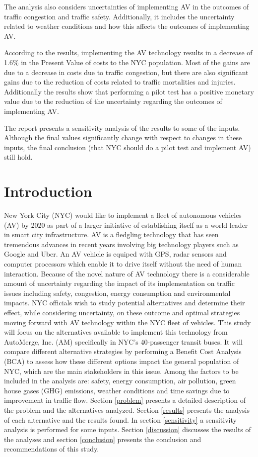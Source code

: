 \documentclass[11pt, letterpaper]{article}
\begin{document}
The analysis also considers uncertainties of implementing AV in the outcomes of traffic congestion and
traffic safety. Additionally, it includes the uncertainty related to weather conditions and how this affects the outcomes
of implementing AV.

According to the results, implementing the AV technology results in a decrease of 1.6\% in the Present Value of costs 
to the NYC population. Most of the gains are due to a decrease in costs due to traffic congestion, but there are also significant gains 
due to the reduction of costs related to traffic mortalities and injuries. Additionally the results show that 
performing a pilot test has a positive monetary value due to the reduction of the uncertainty regarding the 
outcomes of implementing AV.

The report presents a sensitivity analysis of the results to some of the inputs. Although the final values significantly change
with respect to changes in these inputs, the final conclusion (that NYC should do a pilot test and implement AV) still hold.


\pagebreak
\section{Introduction} \label{intro}

New York City (NYC) would like to implement a fleet of autonomous
vehicles (AV) by 2020 as part of a larger initiative of establishing
itself as a world leader in smart city infrastructure. AV is a fledgling technology
that has seen tremendous advances in recent years involving
big technology players such as Google and Uber. An AV vehicle is equiped with
GPS, radar sensors and computer processors which enable it to drive itself without the
need of human interaction. Because of the
novel nature of AV technology there is a considerable amount of
uncertainty regarding the impact of its implementation on traffic
issues including safety, congestion, energy consumption and environmental impacts.
NYC officials wish to study potential alternatives and determine their effect, while
considering uncertainty, on these outcome
and optimal strategies moving forward with AV
technology within the NYC fleet of vehicles. This study will focus on
the alternatives available to implement  this technology
from AutoMerge, Inc. (AM) specifically in NYC's 40-passenger transit
buses. It will compare different alternative strategies by performing
a Benefit Cost Analysis (BCA) to assess how these different options
impact the general population of NYC, which are the main stakeholders
in this issue. Among the factors to be included in the analysis are:
safety, energy consumption, air pollution, green house gases (GHG) emissions, weather
conditions and time savings due to improvement in traffic flow. Section \ref{problem}
presents a detailed description of the problem and the alternatives analyzed. Section
\ref{results} presents the analysis of each alternative and the
results found. In section \ref{sensitivity} a sensitivity analysis is
performed for some inputs. Section \ref{discussion} discusses the
results of the analyses and section \ref{conclusion} presents the
conclusion and recommendations of this study.
\end{document}
